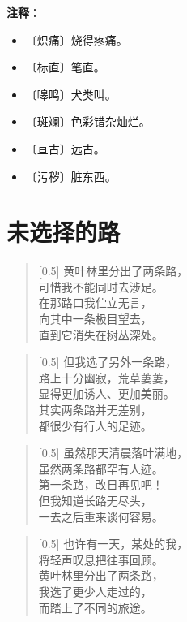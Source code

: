\documentclass[12pt,UTF-8,openany]{ctexbook}
\begin{document}
\newpage

\textbf{注释}：

\vspace{-1em}

\begin{itemize}
    \setlength\itemsep{-0.2em}
    \item 〔炽痛〕烧得疼痛。
    \item 〔标直〕笔直。
    \item 〔嗥鸣〕犬类叫。
    \item 〔斑斓〕色彩错杂灿烂。
    \item 〔亘古〕远古。
    \item 〔污秽〕脏东西。
\end{itemize}

\chapter{未选择的路}

\begin{normalsize}
    
    \begin{verse}[0.5\linewidth]
        黄叶林里分出了两条路， \\
        可惜我不能同时去涉足。 \\
        在那路口我伫立无言， \\
        向其中一条极目望去， \\
        直到它消失在树丛深处。
    \end{verse}
    
    
    \begin{verse}[0.5\linewidth]
        但我选了另外一条路， \\
        路上十分幽寂，荒草萋萋， \\
        显得更加诱人、更加美丽。 \\
        其实两条路并无差别， \\
        都很少有行人的足迹。
    \end{verse}
    
    
    \begin{verse}[0.5\linewidth]
        虽然那天清晨落叶满地， \\
        虽然两条路都罕有人迹。 \\
        第一条路，改日再见吧！ \\
        但我知道长路无尽头， \\
        一去之后重来谈何容易。
    \end{verse}
    
    
    \begin{verse}[0.5\linewidth]
        也许有一天，某处的我， \\
        将轻声叹息把往事回顾。 \\
        黄叶林里分出了两条路， \\
        我选了更少人走过的， \\
        而踏上了不同的旅途。
    \end{verse}
    
\end{normalsize}
\end{document}
